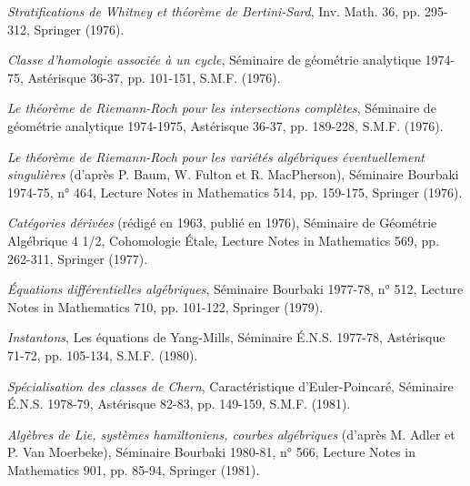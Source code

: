 \begin{description}
\item[{[24]}] \emph{Stratifications de Whitney et théorème de Bertini-Sard},
Inv. Math. 36, pp. 295-312, Springer (1976).

\item[{[25]}] \emph{Classe d'homologie associée à un cycle}, Séminaire de
géométrie analytique 1974-75, Astérisque 36-37, pp. 101-151, S.M.F. (1976).

\item[{[26]}] \emph{Le théorème de Riemann-Roch pour les intersections
complètes}, Séminaire de géométrie analytique 1974-1975, Astérisque 36-37,
pp. 189-228, S.M.F. (1976).

\item[{[27]}] \emph{Le théorème de Riemann-Roch pour les variétés algébriques
éventuellement singulières} (d'après P. Baum, W. Fulton et R. MacPherson),
Séminaire Bourbaki 1974-75, n° 464, Lecture Notes in Mathematics 514,
pp. 159-175, Springer (1976).

\item[{[28]}] \emph{Catégories dérivées} (rédigé en 1963, publié en 1976),
Séminaire de Géométrie Algébrique 4 1/2, Cohomologie Étale,
Lecture Notes in Mathematics 569, pp. 262-311, Springer (1977).

\item[{[29]}] \emph{Équations différentielles algébriques}, Séminaire
Bourbaki 1977-78, n° 512, Lecture Notes in Mathematics 710, pp. 101-122,
Springer (1979).

\item[{[30]}] \emph{Instantons}, Les équations de Yang-Mills, Séminaire
É.N.S. 1977-78, Astérisque 71-72, pp. 105-134, S.M.F. (1980).

\item[{[31]}] \emph{Spécialisation des classes de Chern}, Caractéristique
d'Euler-Poincaré, Séminaire É.N.S. 1978-79, Astérisque 82-83, pp. 149-159,
S.M.F. (1981).

\item[{[32]}] \emph{Algèbres de Lie, systèmes hamiltoniens, courbes
algébriques} (d'après M. Adler et P. Van Moerbeke), Séminaire Bourbaki
1980-81, n° 566, Lecture Notes in Mathematics 901, pp. 85-94,
Springer (1981).


\end{description}
